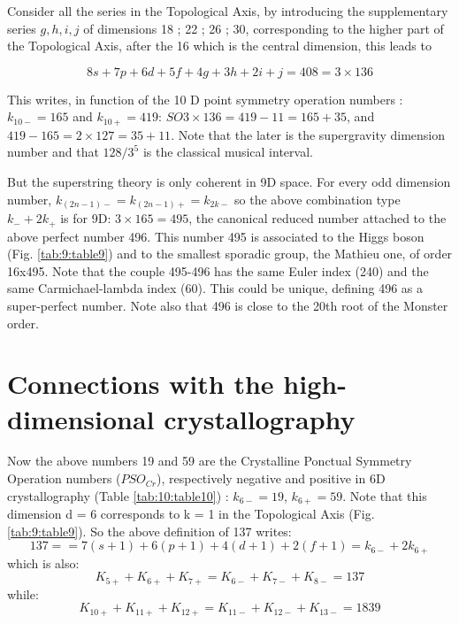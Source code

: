 \documentclass[a4paper,9pt]{article}
\begin{document}
     Consider all the series in the Topological Axis, by introducing the supplementary series $g, h, i, j$ of dimensions 18 ; 22 ; 26 ; 30, corresponding to the higher part of the Topological Axis, after the 16 which is the central dimension, this leads to
     
     \begin{equation}
      8s + 7p + 6 d + 5f + 4g + 3h + 2i + j = 408 = 3 \times 136   
     \end{equation}
      
     
     This writes, in function of the 10 D point symmetry operation numbers :  $k_{10-} = 165$ and $k_{10+} = 419$: $SO3 \times 136 = 419 - 11 = 165 + 35$, and $419-165 = 2 \times 127 =  35 + 11$. Note that the later is the supergravity dimension number and that $128/3^5$ is the classical musical interval. 
     
     
     But the superstring theory is only coherent in 9D space. For every odd dimension number, $k_{(2n - 1)-} = k_{(2n - 1)+} = k_{2k-}$ so the above combination type $k_- + 2k_+$ is for 9D: $3 \times 165 = 495$, the canonical reduced number attached to the above perfect number 496. This number 495 is associated to the Higgs boson (Fig. \ref{tab:9:table9}) and to the smallest sporadic group, the Mathieu one, of order 16x495. Note that the couple 495-496 has the same Euler index (240) and the same Carmichael-lambda index (60). This could be unique, defining 496 as a super-perfect number. Note also that 496 is close to the 20th root of the Monster order.
 
 
 
 
 
 
 
 
 
 \section{Connections with the high-dimensional crystallography}
 
 Now the above numbers 19 and 59 are the Crystalline Ponctual Symmetry Operation numbers ($PSO_{Cr}$), respectively negative and positive in 6D crystallography \cite{Weigel} (Table \ref{tab:10:table10}) : $k_{6-} = 19$, $k_{6+} = 59$. Note that this dimension d = 6 corresponds to k = 1 in the Topological Axis (Fig. \ref{tab:9:table9}). So the above definition of 137 writes:
  \begin{equation}
   137 =   = 7(s +1) + 6(p +1) + 4(d +1) + 2(f +1) = k_{6-} + 2k_{6+}   
    \end{equation}
    which is also:
    \begin{equation}
    K_{5+}+K_{6+}+K_{7+} = K_{6-} + K_{7-} +K_{8-} = 137   
    \end{equation}
    while:
    \begin{equation}
    K_{10+} +K_{11+}+K_{12+} = K_{11-} +K_{12-}+K_{13-} = 1839   
    \end{equation}
    
\end{document}
